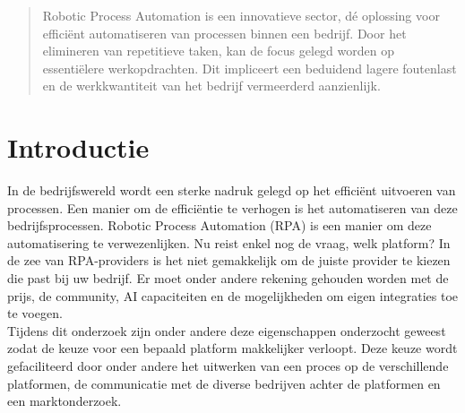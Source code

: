 \documentclass[a0,portrait]{a0poster}
\begin{document}
\begin{multicols}{2}


\color{HoGentAccent1}

\begin{abstract}
	Robotic Process Automation is een innovatieve sector, dé oplossing voor efficiënt automatiseren van processen binnen een bedrijf. Door het elimineren van repetitieve taken, kan de focus gelegd worden op essentiëlere werkopdrachten. Dit impliceert een beduidend lagere foutenlast en de werkkwantiteit van het bedrijf vermeerderd aanzienlijk. 
\end{abstract}

\color{HoGentAccent1} 
\section*{Introductie}
\color{black}
In de bedrijfswereld wordt een sterke nadruk gelegd op het efficiënt uitvoeren van processen. Een manier om de efficiëntie te verhogen is het automatiseren van deze bedrijfsprocessen. Robotic Process Automation (RPA) is een manier om deze automatisering te verwezenlijken. Nu reist enkel nog de vraag, welk platform? In de zee van RPA-providers is het niet gemakkelijk om de juiste provider te kiezen die past bij uw bedrijf. Er moet onder andere rekening gehouden worden met de prijs, de community, AI capaciteiten en de mogelijkheden om eigen integraties toe te voegen.\\
Tijdens dit onderzoek zijn onder andere deze eigenschappen onderzocht geweest zodat de keuze voor een bepaald platform makkelijker verloopt. Deze keuze wordt gefaciliteerd door onder andere het uitwerken van een proces op de verschillende platformen, de communicatie met de diverse bedrijven achter de platformen en een marktonderzoek.

\color{Black}
\color{HoGentAccent1} 

\end{multicols}
\end{document}
